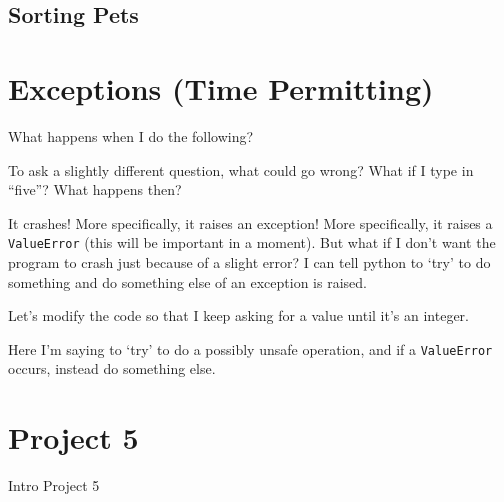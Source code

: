 \documentclass[12pt]{article}
\begin{document}
\subsection{Sorting Pets}



\section{Exceptions (Time Permitting)}

What happens when I do the following?



\noindent
To ask a slightly different question, what could go wrong?  What if I type in
``five''?  What happens then?

It crashes!  More specifically, it raises an exception!  More specifically, it
raises a \lstinline{ValueError} (this will be important in a moment).  But what
if I don't want the program to crash just because of a slight error?  I can
tell python to `try' to do something and do something else of an exception is
raised.



\noindent
Let's modify the code so that I keep asking for a value until it's an integer.



\noindent
Here I'm saying to `try' to do a possibly unsafe operation, and if a
\lstinline{ValueError} occurs, instead do something else.

\section*{Project 5}

Intro Project 5
\end{document}
